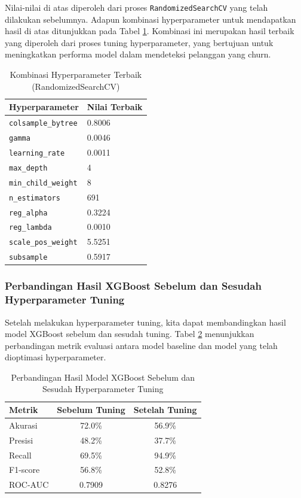 Nilai-nilai di atas diperoleh dari proses \texttt{RandomizedSearchCV} yang telah dilakukan sebelumnya. Adapun kombinasi hyperparameter untuk mendapatkan hasil di atas ditunjukkan pada Tabel \ref{tab:best_params_xgboost}. Kombinasi ini merupakan hasil terbaik yang diperoleh dari proses tuning hyperparameter, yang bertujuan untuk meningkatkan performa model dalam mendeteksi pelanggan yang churn.

\begin{table}[H]
    \centering
    \caption{Kombinasi Hyperparameter Terbaik (RandomizedSearchCV)}
    \label{tab:best_params_xgboost}
    \begin{tabular}{|l|l|}
        \hline
        \textbf{Hyperparameter} & \textbf{Nilai Terbaik} \\ \hline
        \texttt{colsample\_bytree} & 0.8006 \\ \hline
        \texttt{gamma} & 0.0046 \\ \hline
        \texttt{learning\_rate} & 0.0011 \\ \hline
        \texttt{max\_depth} & 4 \\ \hline
        \texttt{min\_child\_weight} & 8 \\ \hline
        \texttt{n\_estimators} & 691 \\ \hline
        \texttt{reg\_alpha} & 0.3224 \\ \hline
        \texttt{reg\_lambda} & 0.0010 \\ \hline
        \texttt{scale\_pos\_weight} & 5.5251 \\ \hline
        \texttt{subsample} & 0.5917 \\ \hline
    \end{tabular}
\end{table}

\subsubsection{Perbandingan Hasil XGBoost Sebelum dan Sesudah Hyperparameter Tuning}

Setelah melakukan hyperparameter tuning, kita dapat membandingkan hasil model XGBoost sebelum dan sesudah tuning. Tabel \ref{tab:comparison_xgboost} menunjukkan perbandingan metrik evaluasi antara model baseline dan model yang telah dioptimasi hyperparameter.

\begin{table}[H]
    \centering
    \caption{Perbandingan Hasil Model XGBoost Sebelum dan Sesudah Hyperparameter Tuning}
    \label{tab:comparison_xgboost}
    \begin{tabular}{|l|c|c|}
        \hline
        \textbf{Metrik} & \textbf{Sebelum Tuning} & \textbf{Setelah Tuning} \\ \hline
        Akurasi & 72.0\% & 56.9\% \\ \hline
        Presisi & 48.2\% & 37.7\% \\ \hline
        Recall & 69.5\% & 94.9\% \\ \hline
        F1-score & 56.8\% & 52.8\% \\ \hline
        ROC-AUC & 0.7909 & 0.8276 \\ \hline
    \end{tabular}
\end{table}

